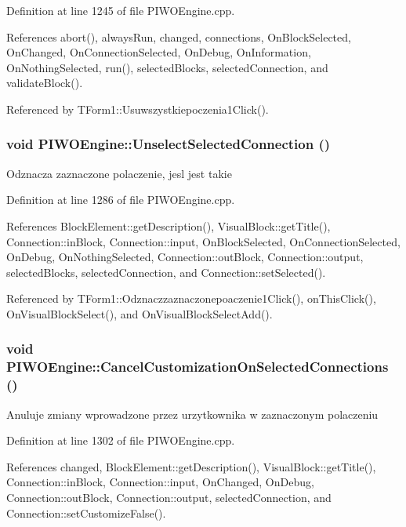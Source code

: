Definition at line 1245 of file PIWOEngine.cpp.

References abort(), alwaysRun, changed, connections, OnBlockSelected, OnChanged, OnConnectionSelected, OnDebug, OnInformation, OnNothingSelected, run(), selectedBlocks, selectedConnection, and validateBlock().

Referenced by TForm1::Usuwszystkiepoczenia1Click().\hypertarget{classPIWOEngine_2ec5c192d058a7a44ab82a30fa331c99}{
\subsubsection[UnselectSelectedConnection]{\setlength{\rightskip}{0pt plus 5cm}void PIWOEngine::UnselectSelectedConnection ()}}
\label{classPIWOEngine_2ec5c192d058a7a44ab82a30fa331c99}


Odznacza zaznaczone polaczenie, jesl jest takie 

Definition at line 1286 of file PIWOEngine.cpp.

References BlockElement::getDescription(), VisualBlock::getTitle(), Connection::inBlock, Connection::input, OnBlockSelected, OnConnectionSelected, OnDebug, OnNothingSelected, Connection::outBlock, Connection::output, selectedBlocks, selectedConnection, and Connection::setSelected().

Referenced by TForm1::Odznaczzaznaczonepoaczenie1Click(), onThisClick(), OnVisualBlockSelect(), and OnVisualBlockSelectAdd().\hypertarget{classPIWOEngine_2e52cfe4cc826cd43595ca9c7ae979f9}{
\subsubsection[CancelCustomizationOnSelectedConnections]{\setlength{\rightskip}{0pt plus 5cm}void PIWOEngine::CancelCustomizationOnSelectedConnections ()}}
\label{classPIWOEngine_2e52cfe4cc826cd43595ca9c7ae979f9}


Anuluje zmiany wprowadzone przez urzytkownika w zaznaczonym polaczeniu 

Definition at line 1302 of file PIWOEngine.cpp.

References changed, BlockElement::getDescription(), VisualBlock::getTitle(), Connection::inBlock, Connection::input, OnChanged, OnDebug, Connection::outBlock, Connection::output, selectedConnection, and Connection::setCustomizeFalse().

